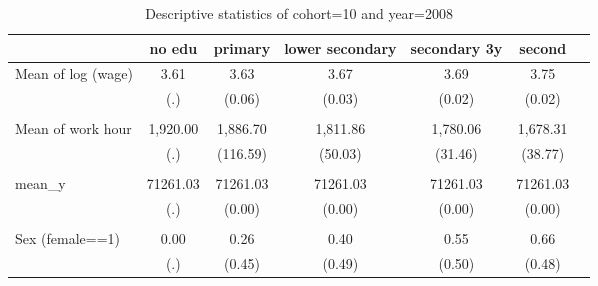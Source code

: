 \begin{table}[htbp]\centering
    \caption{\label{desc-table-cohort10}Descriptive statistics of cohort=10 and year=2008}
    \begin{tabular}{l*{6}{c}}

        \hline
                        &   no edu& primary&lower secondary&secondary 3y&second\\
        \hline
        Mean of log (wage)&     3.61&     3.63&     3.67&     3.69&     3.75\\
                        &      (.)&   (0.06)&   (0.03)&   (0.02)&   (0.02)\\
        \\
        Mean of work hour& 1,920.00& 1,886.70& 1,811.86& 1,780.06& 1,678.31\\
                        &      (.)& (116.59)&  (50.03)&  (31.46)&  (38.77)\\
        \\
        mean\_y          & 71261.03& 71261.03& 71261.03& 71261.03& 71261.03\\
                        &      (.)&   (0.00)&   (0.00)&   (0.00)&   (0.00)\\
        \\
        Sex (female==1) &     0.00&     0.26&     0.40&     0.55&     0.66\\
                        &      (.)&   (0.45)&   (0.49)&   (0.50)&   (0.48)\\
        \hline
    \end{tabular}
\end{table}